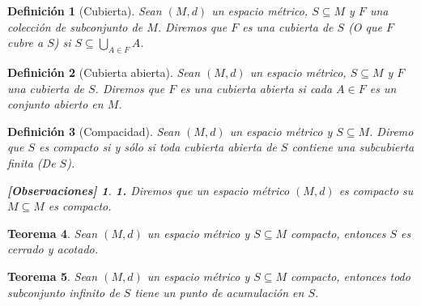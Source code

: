 \documentclass[oneside]{book} %
\theoremstyle{Teorema}
\newtheorem{Definicion}{Definición}[chapter]
\newtheorem{Teorema}[Definicion]{Teorema}
\theoremstyle{Ejemplos}
\theoremstyle{[Obs]}
\newtheorem*{Obs}{[Observaciones]}
\renewcommand{\{}{\left\lbrace} %
\renewcommand{\}}{\right\rbrace} %
\newcommand{\U}{\bigcup} %
\renewcommand{\sc}{\subseteq} %
\begin{document}
			\begin{Definicion}[Cubierta]
				
				Sean $(M, d)$ un espacio métrico, $S \sc M$ y $F$ una colección de subconjunto de $M$. Diremos que $F$ es una cubierta de $S$ (O que $F$ cubre a $S$) si $S \sc \displaystyle\U_{A \in F} A$. \\

			\end{Definicion}

			\begin{Definicion}[Cubierta abierta]
				
				Sean $(M, d)$ un espacio métrico, $S \sc M$ y $F$ una cubierta de $S$. Diremos que $F$ es una cubierta abierta si cada $A \in F$ es un conjunto abierto en $M$. \\

			\end{Definicion}

			\begin{Definicion}[Compacidad]
				
				Sean $(M, d)$ un espacio métrico y $S \sc M$. Diremo que $S$ es compacto si y sólo si toda cubierta abierta de $S$ contiene una subcubierta finita (De $S$). \\

				\begin{Obs}
				
					\hfill
				
					\textbf{1.} Diremos que un espacio métrico $(M, d)$ es compacto su $M \sc M$ es compacto. \\
				
				\end{Obs}

			\end{Definicion}

			\begin{Teorema}
				
				Sean $(M, d)$ un espacio métrico y $S \sc M$ compacto, entonces $S$ es cerrado y acotado. \\

			\end{Teorema}

			\begin{Teorema}
				
				Sean $(M, d)$ un espacio métrico y $S \sc M$ compacto, entonces todo subconjunto infinito de $S$ tiene un punto de acumulación en $S$. \\

			\end{Teorema}
\end{document}
